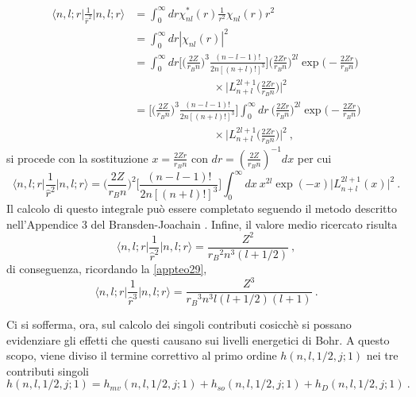 \documentclass[12pt,a4paper]{report}
\numberwithin{equation}{section}
\numberwithin{section}{chapter}
\begin{document}
	\begin{align}
	\label{appteo31}
	\bigg\langle n,l;r\bigg|\frac{1}{\widehat{r}^2}\bigg|n,l;r\bigg\rangle&= 
	\int_{0}^{\infty}dr\chi_{nl}^*(r)\frac{1}{{r}^2}\chi_{nl}(r)r^2\\
	&=\int_{0}^{\infty}dr|\chi_{nl}(r)|^2\nonumber\\
	&=\int_{0}^{\infty}dr\bigg[\bigg(\frac{2Z}{r_Bn}\bigg)^{3}\frac{(n-l-1)!}{2n[(n+l)!]^3}\bigg]\bigg(\frac{2Zr}{r_Bn}\bigg)^{2l}\exp\bigg(-\frac{2Zr}{r_Bn}\bigg)\nonumber\\
	&\hspace{3cm}\times\bigg|L_{n+l}^{2l+1}\bigg(\frac{2Zr}{r_Bn}\bigg)\bigg|^2\nonumber\\
	&=\bigg[\bigg(\frac{2Z}{r_Bn}\bigg)^{3}\frac{(n-l-1)!}{2n[(n+l)!]^3}\bigg]\int_{0}^{\infty}dr~\bigg(\frac{2Zr}{r_Bn}\bigg)^{2l}\exp\bigg(-\frac{2Zr}{r_Bn}\bigg)\nonumber\\
	&\hspace{3cm}\times\bigg|L_{n+l}^{2l+1}\bigg(\frac{2Zr}{r_Bn}\bigg)\bigg|^2~,\nonumber
	\end{align}
	si procede con la sostituzione $x=\frac{2Zr}{r_Bn}$ con $dr = (\frac{2Z}{r_Bn})^{-1}dx$ per cui
	\begin{equation}
	\label{appteo32}
	\bigg\langle n,l;r\bigg|\frac{1}{\widehat{r}^2}\bigg|n,l;r\bigg\rangle =
	\bigg(\frac{2Z}{r_Bn}\bigg)^{2}\bigg[\frac{(n-l-1)!}{2n[(n+l)!]^3}\bigg]\int_{0}^{\infty}dx~x^{2l}\exp(-x)\big|L_{n+l}^{2l+1}(x)\big|^2~.
	\end{equation}
	Il calcolo di questo integrale pu\`o essere completato seguendo il metodo descritto nell'Appendice 3 del Bransden-Joachain \cite{BJ}.
	Infine, il valore medio ricercato risulta
	\begin{equation}
	\label{appteo33}
	\bigg\langle n,l;r\bigg|\frac{1}{\widehat{r}^2}\bigg|n,l;r\bigg\rangle=
	\frac{Z^2}{{r_B}^2n^3(l+1/2)}~,
	\end{equation}
	di conseguenza, ricordando la \eqref{appteo29},
	\begin{equation}
	\label{appteo34}
	\bigg\langle n,l;r\bigg|\frac{1}{\widehat{r}^3}\bigg|n,l;r\bigg\rangle=
	\frac{Z^3}{{r_B}^3n^3l(l+1/2)(l+1)}~.
	\end{equation}
	
	Ci si sofferma, ora, sul calcolo dei singoli contributi cosicch\`e si possano evidenziare gli effetti che questi causano sui livelli energetici di Bohr. A questo scopo, viene diviso il termine correttivo al primo ordine $h(n,l,1/2,j;1)$ nei tre contributi singoli
	\begin{equation}
	\label{appteo35}
	h(n,l,1/2,j;1) = h_{mv}(n,l,1/2,j;1) + h_{so}(n,l,1/2,j;1) + h_D(n,l,1/2,j;1)~.
	\end{equation}
	
\end{document}
